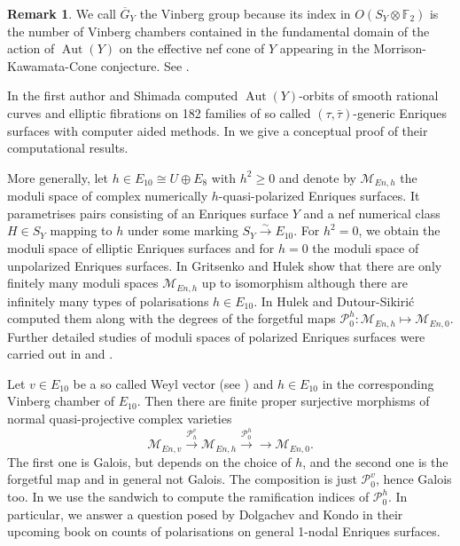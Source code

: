 \documentclass{amsart}
\theoremstyle{definition}
\newtheorem{remark}[definition]{Remark}
\theoremstyle{plain}
\DeclareMathOperator{\Aut}{Aut}
\newcommand{\FF}{\mathbb{F}}
\newcommand{\M}{\mathcal{M}}
\renewcommand{\P}{\mathcal{P}}
\newcommand{\Gbar}{\overline{G}}
\newcommand{\taubar}{\bar{\tau}}
\begin{document}
\begin{remark}
We call $\Gbar_Y$ the Vinberg group because its index in $O(S_Y \otimes \FF_2)$ is the number of Vinberg chambers contained in the fundamental domain of the action of $\Aut(Y)$ on the effective nef cone of $Y$ appearing in the Morrison-Kawamata-Cone conjecture. See .
\end{remark}
In \cite{brandhorst_shimada:tautaubar} the first author and Shimada computed $\Aut(Y)$-orbits of smooth rational curves and elliptic fibrations on 182 families of so called $(\tau,\taubar)$-generic Enriques surfaces with computer aided methods. In  we give a conceptual proof of their computational results.

More generally, let $h \in E_{10}\cong U\oplus E_8$ with $h^2\geq 0$ and denote by $\M_{En,h}$ the moduli space of complex numerically $h$-quasi-polarized Enriques surfaces. It parametrises pairs consisting of an Enriques surface $Y$ and a nef numerical class $H \in S_Y$ mapping to $h$ under some marking $S_Y \xrightarrow{\sim} E_{10}$. For $h^2=0$, we obtain the moduli space of elliptic Enriques surfaces and for $h=0$ the moduli space of unpolarized Enriques surfaces.
In \cite{gritsenko-hulek} Gritsenko and Hulek show that there are only finitely many moduli spaces $\M_{En,h}$ up to isomorphism although there are infinitely many types of polarisations $h \in E_{10}$.
In \cite{hulek-dutour} Hulek and Dutour-Sikirić computed them along with the degrees of the forgetful maps $\P^h_0\colon \M_{En,h} \mapsto \M_{En,0}$.
Further detailed studies of moduli spaces of polarized Enriques surfaces were carried out in \cite{ciliberto23} and \cite{knutsen}.

Let $v \in E_{10}$ be a so called Weyl vector (see ) and $h \in E_{10}$ in the corresponding Vinberg chamber of $E_{10}$. Then there are finite proper surjective morphisms of normal quasi-projective complex varieties
\[\M_{En,v} \xrightarrow{\P^v_h}\M_{En,h} \xrightarrow{\P^h_0}{\to} \M_{En,0}.\]
The first one is Galois, but depends on the choice of $h$, and the second one is the forgetful map and in general not Galois.
The composition is just $\P^v_0$, hence Galois too. In  we use the sandwich to compute the ramification indices of $\P^h_0$. In particular, we answer a question posed by Dolgachev and Kondo in their upcoming book \cite[Table 8.3]{enriquesII} on counts of polarisations on general 1-nodal Enriques surfaces.
\end{document}
